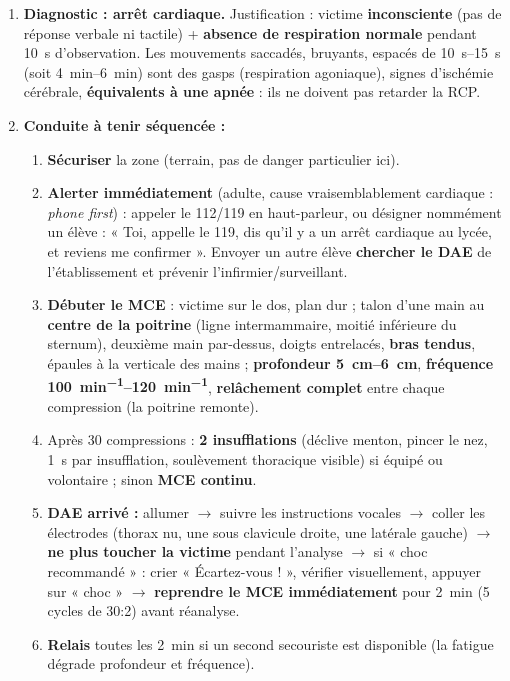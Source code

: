 \documentclass[11pt]{article}
\newcommand{\cle}[1]{{\popxbold\color{popdark}#1}}
\begin{document}
\begin{corrige}
\begin{enumerate}
    \item \textbf{Diagnostic : arrêt cardiaque.} Justification : victime \textbf{inconsciente} (pas de réponse verbale ni tactile) + \textbf{absence de respiration normale} pendant \SI{10}{s} d'observation. Les mouvements saccadés, bruyants, espacés de \SIrange{10}{15}{s} (soit \SIrange{4}{6}{min}) sont des \cle{gasps} (respiration agoniaque), signes d'ischémie cérébrale, \textbf{équivalents à une apnée} : ils ne doivent pas retarder la RCP.
    \item \textbf{Conduite à tenir séquencée :}
    \begin{enumerate}
        \item \textbf{Sécuriser} la zone (terrain, pas de danger particulier ici).
        \item \textbf{Alerter immédiatement} (adulte, cause vraisemblablement cardiaque : \emph{phone first}) : appeler le 112/119 en haut-parleur, ou désigner nommément un élève : « Toi, appelle le 119, dis qu'il y a un arrêt cardiaque au lycée, et reviens me confirmer ». Envoyer un autre élève \textbf{chercher le DAE} de l'établissement et prévenir l'infirmier/surveillant.
        \item \textbf{Débuter le MCE} : victime sur le dos, plan dur ; talon d'une main au \textbf{centre de la poitrine} (ligne intermammaire, moitié inférieure du sternum), deuxième main par-dessus, doigts entrelacés, \textbf{bras tendus}, épaules à la verticale des mains ; \textbf{profondeur \SIrange{5}{6}{cm}}, \textbf{fréquence \SIrange{100}{120}{min^{-1}}}, \textbf{relâchement complet} entre chaque compression (la poitrine remonte).
        \item Après 30 compressions : \textbf{2 insufflations} (déclive menton, pincer le nez, \SI{1}{s} par insufflation, soulèvement thoracique visible) si équipé ou volontaire ; sinon \textbf{MCE continu}.
        \item \textbf{DAE arrivé :} allumer $\rightarrow$ suivre les instructions vocales $\rightarrow$ coller les électrodes (thorax nu, une sous clavicule droite, une latérale gauche) $\rightarrow$ \textbf{ne plus toucher la victime} pendant l'analyse $\rightarrow$ si « choc recommandé » : crier « Écartez-vous ! », vérifier visuellement, appuyer sur « choc » $\rightarrow$ \textbf{reprendre le MCE immédiatement} pour \SI{2}{min} (5 cycles de 30:2) avant réanalyse.
        \item \textbf{Relais} toutes les \SI{2}{min} si un second secouriste est disponible (la fatigue dégrade profondeur et fréquence).

\end{enumerate}
\end{enumerate}
\end{corrige}
\end{document}
